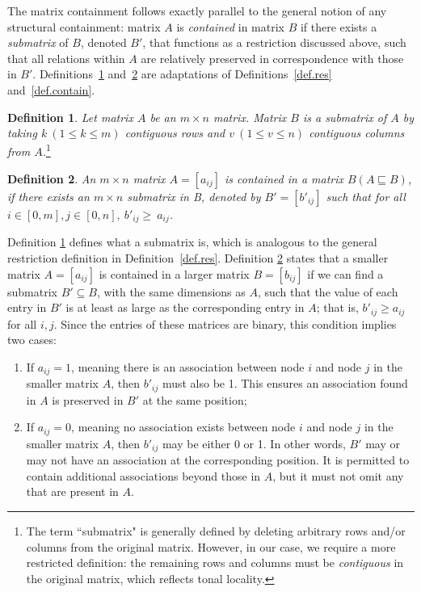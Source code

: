 \documentclass{CUP-JNL-PHO}%
\theoremstyle{definition}
\numberwithin{equation}{section}
\theoremstyle{definition}
\newtheorem{definition}{Definition}[section]
\begin{document}
The matrix containment follows exactly parallel to the general notion
of any structural containment: matrix $A$ is \textit{contained} in
matrix $B$ if there exists a \textit{submatrix} of $B$, denoted $B'$,
that functions as a restriction discussed above, such that all
relations within $A$ are relatively preserved in correspondence with
those in $B'$. Definitions~\ref{def.submatrix} and~\ref{def.ar.matching} 
are adaptations of Definitions~\ref{def.res} and~\ref{def.contain}. 
\begin{definition}
	\label{def.submatrix}
	\textit{Let matrix $A$ be an $m \times n$ matrix.  Matrix $B$ is a
		\emph{submatrix}
		of $A$ by taking $k \ (1 \leq k \leq m)$ contiguous rows and $v \ (1 \leq v
		\leq n)$ contiguous columns from $A$.}\footnote{The term ``submatrix" is
		generally defined by deleting arbitrary rows and/or columns from the original
		matrix. However, in our case, we require a more restricted definition: the
		remaining rows and columns must be \textit{contiguous} in the original matrix,
		which reflects tonal locality.}
\end{definition}

\begin{definition}
	\label{def.ar.matching}
	\textit{
		An $m\times n$ matrix $A = [a_{ij}]$ is \emph{contained} in a matrix $B (A
		\sqsubseteq B)$, if there exists an $m\times n$ submatrix in B, denoted by $B' =
		[b'_{ij}]$ such that for all $i \in [0,m] ,j \in [0,n],\ b'_{ij}  \geq \ a_{ij}
		$.}
\end{definition}

Definition \ref{def.submatrix} defines what a submatrix is, which is analogous
to the general restriction definition in Definition~\ref{def.res}. Definition
\ref{def.ar.matching}
states that a smaller matrix \( A = [a_{ij}] \) is contained in a larger matrix
\( B =
[b_{ij}] \) if we can find a submatrix \( B' \subseteq B \), with the same
dimensions as \( A \), such that the value of each entry in \( B' \) 
is at least as large as the corresponding entry in \( A \); that is, \(
b'_{ij} \geq a_{ij} \) for all \( i, j \). Since the entries of these matrices
are binary, this condition implies two cases:

\begin{enumerate}[label=(\alph*)]
	\item If \( a_{ij} = 1 \), meaning there is an association between node \(
	i \) and node \( j \) in the smaller matrix \( A \), then \( b'_{ij} \) must
	also be 1. This ensures an association found in \( A \) is preserved in \(B'\)
	at the same position;
	\item If \( a_{ij} = 0 \), meaning no association exists between node \( i \)
	and node \( j \) in the smaller matrix \( A \), then \( b'_{ij} \) may be
	either 0 or 1. In other words, \( B' \) may or may not have an
	association at the corresponding position. It is permitted to contain
	additional associations beyond those in \( A \), but it must not omit any that
	are present in \( A \).
\end{enumerate}
\end{document}
